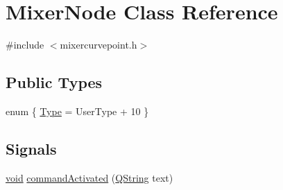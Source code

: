 \hypertarget{class_mixer_node}{\section{\-Mixer\-Node \-Class \-Reference}
\label{class_mixer_node}
}


{\ttfamily \#include $<$mixercurvepoint.\-h$>$}

\subsection*{\-Public \-Types}
\begin{DoxyCompactItemize}
\item 
enum \{ \hyperlink{group___u_a_v_object_widget_utils_ggacfcbe9e0a1b137ea0afeca0789e5e398ae34bb4f715b22e70e0a2182529bed883}{\-Type} =  \-User\-Type + 10
 \}
\end{DoxyCompactItemize}
\subsection*{\-Signals}
\begin{DoxyCompactItemize}
\item 
\hyperlink{group___u_a_v_objects_plugin_ga444cf2ff3f0ecbe028adce838d373f5c}{void} \hyperlink{group___u_a_v_object_widget_utils_ga942a3a9bcc32e276d18b155ef73298f1}{command\-Activated} (\hyperlink{group___u_a_v_objects_plugin_gab9d252f49c333c94a72f97ce3105a32d}{\-Q\-String} text)
\end{DoxyCompactItemize}
